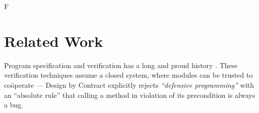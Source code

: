 F\section{Related Work}
\label{s:related}




Program specification and verification has a long and proud history
\cite{Hoare69,behavSurvey2012,Leavens-etal07,dafny,whiley15,usingHistory,Considerate}.
These verification techniques assume a closed system, where modules can be trusted
to co{\"o}perate ---  Design by Contract \cite{MeyerDBC92} explicitly
rejects \textit{``defensive programming''}  with an ``absolute rule''
that calling a method in violation of its precondition is always a
bug.

%



